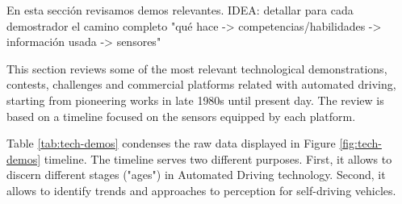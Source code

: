
En esta sección revisamos demos relevantes.
IDEA: detallar para cada demostrador el camino completo "qué hace -> competencias/habilidades -> información usada -> sensores"

This section reviews some of the most relevant technological demonstrations,
contests, challenges and commercial platforms related with automated driving, 
starting from pioneering works in late 1980s until present day. The review is
based on a timeline focused on the sensors equipped by each platform.

Table \ref{tab:tech-demos} condenses the raw data displayed in Figure 
\ref{fig:tech-demos} timeline. The timeline serves two different purposes. 
First, it allows to discern different stages ("ages") in Automated Driving 
technology. Second, it allows to identify trends and approaches to perception 
for self-driving vehicles.



